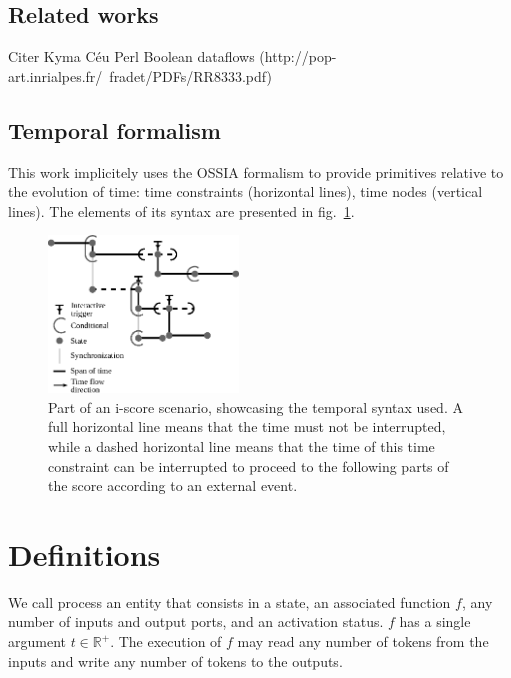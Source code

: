 \documentclass{article}
\begin{document}
    \subsection{Related works}
    Citer Kyma
    Céu
    Perl
    Boolean dataflows (http://pop-art.inrialpes.fr/~fradet/PDFs/RR8333.pdf)
    
    
    \subsection{Temporal formalism}
    This work implicitely uses the OSSIA formalism to provide primitives relative to the evolution of time: time constraints (horizontal lines), time nodes (vertical lines). 
    The elements of its syntax are presented in fig.~\ref{fig.iscore-example}.
    
    \begin{figure}[h]
        \centering
        \includegraphics[width=0.45\textwidth]{images/iscore-example.eps}
        \caption{Part of an i-score scenario, showcasing the temporal syntax used. 
            A full horizontal line means that the time must not be interrupted, 
            while a dashed horizontal line means that the time of this time constraint can be interrupted to proceed 
            to the following parts of the score according to an external event.}
        \label{fig.iscore-example}
    \end{figure}
    
    \section{Definitions}
    We call process an entity that consists in a state, an associated function $f$, any number of inputs and output ports, and an activation status.
    $f$ has a single argument $t \in \mathbb{R^+}$.
    The execution of $f$ may read any number of tokens from the inputs and write any number of tokens to the outputs.
    
\end{document}
